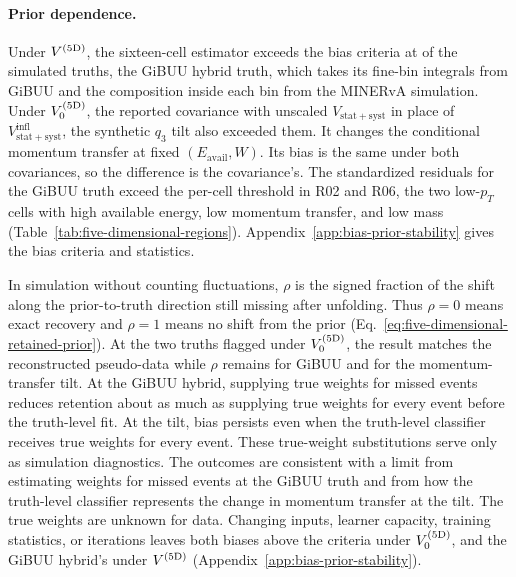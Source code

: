 \paragraph{Prior dependence.} \label{sec:higher-dimensional-prior}
\label{sec:fived16-fd}

Under $V^{(5\mathrm{D})}$, the sixteen-cell estimator exceeds the bias criteria at  of the  simulated truths, the GiBUU hybrid truth, which takes its fine-bin integrals from GiBUU and the composition inside each bin from the MINERvA simulation. Under $V_0^{(5\mathrm{D})}$, the reported covariance with unscaled $V_{\mathrm{stat+syst}}$ in place of $V_{\mathrm{stat+syst}}^{\mathrm{infl}}$, the synthetic $q_3$ tilt also exceeded them. It changes the conditional momentum transfer at fixed $(E_{\mathrm{avail}},W)$. Its bias is the same under both covariances, so the difference is the covariance's. The standardized residuals for the GiBUU truth exceed the per-cell threshold in R02 and R06, the two low-$p_T$ cells with high available energy, low momentum transfer, and low mass (Table~\ref{tab:five-dimensional-regions}). Appendix~\ref{app:bias-prior-stability} gives the bias criteria and statistics.

\label{sec:fived16-prr}
In simulation without counting fluctuations, $\rho$ is the signed fraction of the shift along the prior-to-truth direction still missing after unfolding. Thus $\rho=0$ means exact recovery and $\rho=1$ means no shift from the prior (Eq.~\eqref{eq:five-dimensional-retained-prior}). At the two truths flagged under $V_0^{(5\mathrm{D})}$, the result matches the reconstructed pseudo-data while $\rho$ remains  for GiBUU and  for the momentum-transfer tilt. At the GiBUU hybrid, supplying true weights for missed events reduces retention about as much as supplying true weights for every event before the truth-level fit. At the tilt, bias persists even when the truth-level classifier receives true weights for every event. These true-weight substitutions serve only as simulation diagnostics. The outcomes are consistent with a limit from estimating weights for missed events at the GiBUU truth and from how the truth-level classifier represents the change in momentum transfer at the tilt. The true weights are unknown for data. Changing inputs, learner capacity, training statistics, or iterations leaves both biases above the criteria under $V_0^{(5\mathrm{D})}$, and the GiBUU hybrid's under $V^{(5\mathrm{D})}$ (Appendix~\ref{app:bias-prior-stability}).

